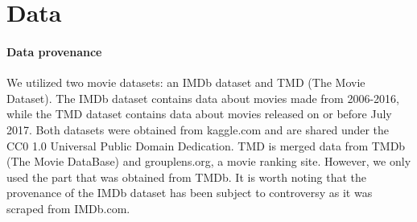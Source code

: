 \section{Data}

    \paragraph{Data provenance}
        We utilized two movie datasets: an IMDb dataset\cite{data:IMDb} and
            TMD\cite{data:TMD} (The Movie Dataset).
        The IMDb dataset contains data about movies made from 2006-2016, while the TMD
            dataset contains data about movies released on or before July 2017.
        Both datasets were obtained from kaggle.com and are shared under the CC0 1.0
            Universal Public Domain Dedication.
        TMD is merged data from TMDb (The Movie DataBase) and grouplens.org, a movie
            ranking site.
        However, we only used the part that was obtained from TMDb.
        It is worth noting that the provenance of the IMDb dataset has been subject to
            controversy as it was scraped from IMDb.com.

